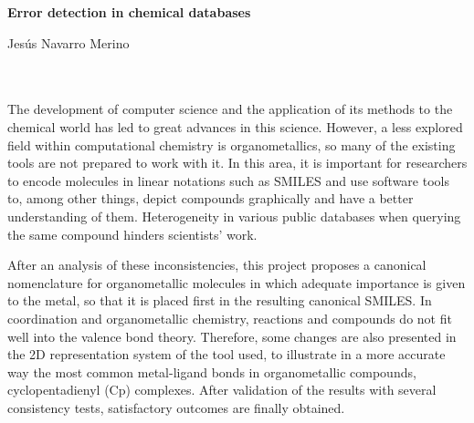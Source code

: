 \cleardoublepage


\thispagestyle{empty}


\begin{center}
{\large\bfseries Error detection in chemical databases}\\
\end{center}
\begin{center}
Jesús Navarro Merino\\
\end{center}

\\

\vspace{0.7cm}
\\

The development of computer science and the application of its methods to the chemical world has led to great advances in this science. However, a less explored field within computational chemistry is organometallics, so many of the existing tools are not prepared to work with it. In this area, it is important for researchers to encode molecules in linear notations such as SMILES and use software tools to, among other things, depict compounds graphically and have a better understanding of them. Heterogeneity in various public databases when querying the same compound hinders scientists' work.

After an analysis of these inconsistencies, this project proposes a canonical nomenclature for organometallic molecules in which adequate importance is given to the metal, so that it is placed first in the resulting canonical SMILES. In coordination and organometallic chemistry, reactions and compounds do not fit well into the valence bond theory. Therefore, some changes are also presented in the 2D representation system of the tool used, to illustrate in a more accurate way the most common metal-ligand bonds in organometallic compounds, cyclopentadienyl (Cp) complexes. After validation of the results with several consistency tests, satisfactory outcomes are finally obtained.

\chapter*{}
\thispagestyle{empty}

